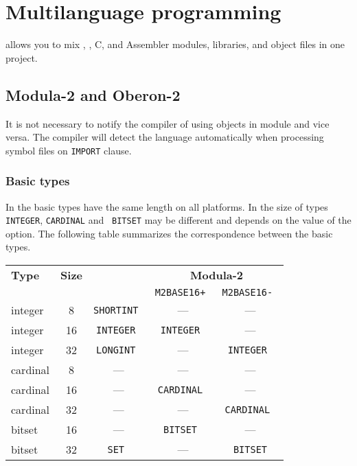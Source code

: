 %

\chapter{Multilanguage programming}\label{multilang}

\xds{} allows you to mix \mt{}, \ot{}, C, and Assembler
modules, libraries, and object files in one project.

\section{Modula-2 and Oberon-2}\label{multilang:m2o2}

It is not necessary to notify the compiler of using \mt{}
objects in \ot{} module and vice versa. The compiler will detect
the language automatically when processing symbol files on
\verb'IMPORT' clause.

\subsection{Basic types}

In \ot{} the basic types have the same length on all platforms. In
\mt{} the size of types {\tt INTEGER}, {\tt CARDINAL} and {\tt
BITSET} may be different and depends on the value of the
 option. The following table summarizes the correspondence
between the basic types.
\begin{center}
\begin{tabular}{lcccc}
\bf Type & \bf Size & \bf \ot{} & \multicolumn{2}{c|}{\bf Modula-2}     \\
         &      &              & \tt M2BASE16+ & \tt M2BASE16-   \\ \hline
integer  & 8    & \tt SHORTINT &     ---       &     ---      \\
integer  & 16   & \tt INTEGER  & \tt INTEGER   &     ---      \\
integer  & 32   & \tt LONGINT  &     ---       & \tt INTEGER  \\
cardinal & 8    &     ---      &     ---       &     ---      \\
cardinal & 16   &     ---      & \tt CARDINAL  &     ---      \\
cardinal & 32   &     ---      &     ---       & \tt CARDINAL \\
bitset   & 16   &     ---      & \tt BITSET    &     ---      \\
bitset   & 32   & \tt SET      &     ---       & \tt BITSET
\end{tabular}
\end{center}

